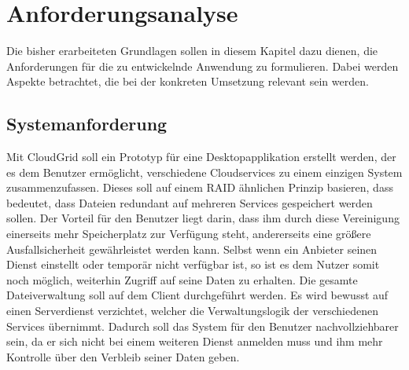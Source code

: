 \chapter{Anforderungsanalyse}
\label{anforderungsanalyse}

Die bisher erarbeiteten Grundlagen sollen in diesem Kapitel dazu dienen, die Anforderungen für die zu entwickelnde Anwendung zu formulieren.
Dabei werden Aspekte betrachtet, die bei der konkreten Umsetzung relevant sein werden.

\section{Systemanforderung}
\label{anforderungcloudgrid}
Mit CloudGrid soll ein Prototyp für eine Desktopapplikation erstellt werden, der es dem Benutzer ermöglicht, verschiedene Cloudservices zu einem einzigen System zusammenzufassen.
Dieses soll auf einem \ac{RAID} ähnlichen Prinzip basieren, dass bedeutet, dass Dateien redundant auf mehreren Services gespeichert werden sollen.
Der Vorteil für den Benutzer liegt darin, dass ihm durch diese Vereinigung einerseits mehr Speicherplatz zur Verfügung steht, andererseits eine größere Ausfallsicherheit gewährleistet werden kann.
Selbst wenn ein Anbieter seinen Dienst einstellt oder temporär nicht verfügbar ist, so ist es dem Nutzer somit noch möglich, weiterhin Zugriff auf seine Daten zu erhalten.
Die gesamte Dateiverwaltung soll auf dem Client durchgeführt werden.
Es wird bewusst auf einen Serverdienst verzichtet, welcher die Verwaltungslogik der verschiedenen Services übernimmt.
Dadurch soll das System für den Benutzer nachvollziehbarer sein, da er sich nicht bei einem weiteren Dienst anmelden muss und ihm mehr Kontrolle über den Verbleib seiner Daten geben.

